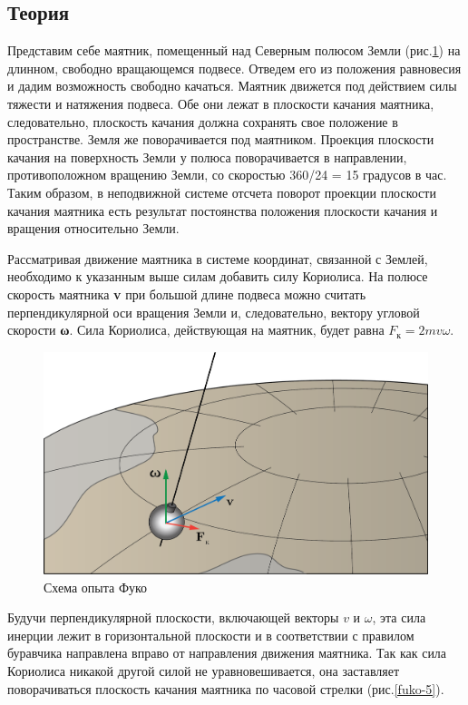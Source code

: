 \documentclass[All.tex]{subfiles}
\begin{document}
	\subsection*{\textcolor{PineGreen}{Теория}}
	
	Представим себе маятник, помещенный над Северным полюсом Земли (рис.\ref{fuko-4}) на длинном, свободно вращающемся подвесе.
	Отведем его из положения равновесия и дадим возможность свободно качаться.
	Маятник движется под действием силы тяжести и натяжения подвеса.
	Обе они лежат в плоскости качания маятника, следовательно, плоскость качания должна сохранять свое положение в пространстве.
	Земля же поворачивается под маятником.
	Проекция плоскости качания на поверхность Земли у полюса поворачивается в направлении, противоположном вращению Земли, со скоростью 360/24 = 15 градусов в час.
	Таким образом, в неподвижной системе отсчета поворот проекции плоскости качания маятника есть результат постоянства положения плоскости качания и вращения относительно Земли.

	Рассматривая движение маятника в системе координат, связанной с Землей, необходимо к указанным выше силам добавить силу Кориолиса.
	На полюсе скорость маятника \textbf{v} при большой длине подвеса можно считать перпендикулярной оси вращения Земли и, следовательно, вектору угловой скорости \textbf{ω}.
	Сила Кориолиса, действующая на маятник, будет равна 
	$ F_{\text{к}} = 2mv\omega $.
	
		\begin{figure}[H] 	
		\centering 	
		\includegraphics[width=0.65\linewidth]{fuko-4.png}
		\caption{Схема опыта Фуко}
		\label{fuko-4}
	\end{figure}
	
	
	Будучи перпендикулярной плоскости, включающей векторы $ v $  и $ \omega $, эта сила инерции лежит в горизонтальной плоскости и в соответствии с правилом буравчика направлена вправо от направления движения маятника. 
	Так как сила Кориолиса никакой другой силой не уравновешивается, она заставляет поворачиваться плоскость качания маятника по часовой стрелки (рис.\ref{fuko-5}).
\end{document}
